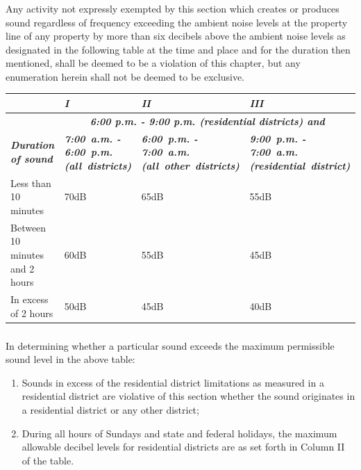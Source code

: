 \subsubsection{}
Any activity not expressly exempted by this section which creates or produces sound regardless of frequency exceeding the ambient noise levels at the property line of any property by more than six decibels above the ambient noise levels as designated in the following table at the time and place and for the duration then mentioned, shall be deemed to be a violation of this chapter, but any enumeration herein shall not be deemed to be exclusive.\\
\begin{center}
\begin{tabular}{|p{3.5cm}|p{3.5cm}|p{3.5cm}|p{3.5cm}|}
    \hline
    \multirow{2}{*}{~} & \emph{\textbf{I}} & \emph{\textbf{II}} & \emph{\textbf{III}}\\
    \hline
    & \multicolumn{3}{|c|}{\emph{\textbf{6:00 p.m. - 9:00 p.m. (residential districts) and}}}\\
    \hline
    \emph{\textbf{Duration of sound}} & \emph{\textbf{\mbox{7:00 a.m.} - \mbox{6:00 p.m.} \mbox{(all districts)}}} & \emph{\textbf{\mbox{6:00 p.m.} - \mbox{7:00 a.m.} \mbox{(all other districts)}}} & \emph{\textbf{\mbox{9:00 p.m.} - \mbox{7:00 a.m.} \mbox{(residential district)}}}\\
    \hline
    Less than 10 minutes & 70dB & 65dB & 55dB\\
    \hline
    Between 10 minutes and 2 hours & 60dB & 55dB & 45dB\\
    \hline
    In excess of 2 hours & 50dB & 45dB & 40dB\\
    \hline
\end{tabular}
\end{center}
\subsubsection{}
In determining whether a particular sound exceeds the maximum permissible sound level in the above table: 
\begin{enumerate}[{\indent}a)]
    \item Sounds in excess of the residential district limitations as measured in a residential district are violative of this section whether the sound originates in a residential district or any other district; 
    \item During all hours of Sundays and state and federal holidays, the maximum allowable decibel levels for residential districts are as set forth in Column II of the table.
\end{enumerate}
